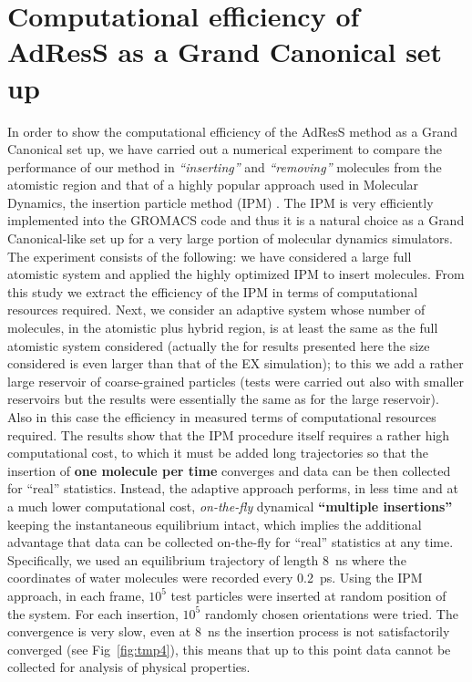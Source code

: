 \documentclass[aip,jcp,a4paper,reprint,onecolumn]{revtex4-1}
\newcommand{\redc}[1]{{\color{red} #1}}
\begin{document}
\section{Computational efficiency of AdResS as a Grand Canonical set up}
\redc{In order to show the computational efficiency of the AdResS method as a Grand Canonical set up, we have carried out a numerical experiment to compare the performance of our method in {\it ``inserting''} and {\it ``removing''} molecules from the atomistic region and that of a highly popular approach used in Molecular Dynamics, the insertion particle method (IPM) \cite{ipm}. The IPM is very efficiently implemented into the GROMACS code \cite{gromacs} and thus it is a natural choice as a Grand Canonical-like set up for a very large portion of molecular dynamics simulators. The experiment consists of the following: we have considered a large full atomistic system and applied the highly optimized IPM to insert molecules. From this study we extract the efficiency of the IPM in terms of computational resources required.
Next, we consider an adaptive system whose number of molecules, in the atomistic plus hybrid region, is at least the same as the full atomistic system considered (actually the for results presented here the size considered is even larger than that of the EX simulation); to this we add a rather large reservoir of coarse-grained particles (tests were carried out also with smaller reservoirs but the results were essentially the same as for the large reservoir). Also in this case the efficiency in measured terms of computational resources required.
The results show that the IPM procedure itself requires a rather high computational cost, to which it must be added long trajectories so that the insertion of {\bf one molecule per time} converges and data can be then collected for ``real'' statistics. Instead, the adaptive approach performs, in less time and at a much lower computational cost, {\it on-the-fly} dynamical {\bf ``multiple insertions''} keeping the instantaneous equilibrium intact, which implies the additional advantage that data can be collected on-the-fly for ``real'' statistics at any time.
 Specifically, we used an equilibrium trajectory of length
8~\textsf{ns} where the coordinates of water molecules were recorded every
0.2~\textsf{ps}.  Using the IPM approach, in each frame, $10^5$ test particles were inserted
at random position of the system. For each insertion, $10^5$ randomly
chosen orientations were tried. The convergence is very
slow, even at 8~\textsf{ns} the insertion process is not satisfactorily converged (see Fig~\ref{fig:tmp4}), this means that up to this point data cannot be collected for analysis of physical properties.
}
\end{document}
